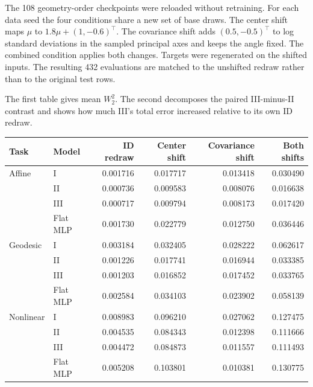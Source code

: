 \documentclass[11pt]{article}
\numberwithin{equation}{section}
\begin{document}
The 108 geometry-order checkpoints were reloaded without retraining.
For each data seed the four conditions share a new set of base draws.
The center shift maps \(\mu\) to \(1.8\mu+(1,-0.6)^\top\).
The covariance shift adds \((0.5,-0.5)^\top\) to log standard deviations
in the sampled principal axes and keeps the angle fixed. The combined
condition applies both changes. Targets were regenerated on the shifted
inputs. The resulting 432 evaluations are matched to the unshifted
redraw rather than to the original test rows.

The first table gives mean \(W_2^2\). The second decomposes the paired
III-minus-II contrast and shows how much III's total error increased
relative to its own ID redraw.

\begin{center}
\small
\begin{tabularx}{\linewidth}{@{} Y l r r r r @{}}
\toprule
\textbf{Task} & \textbf{Model} & \textbf{ID redraw} & \textbf{Center shift} & \textbf{Covariance shift} & \textbf{Both shifts} \\
\midrule
Affine & I & 0.001716 & 0.017717 & 0.013418 & 0.030490 \\
 & II & 0.000736 & 0.009583 & 0.008076 & 0.016638 \\
 & III & 0.000717 & 0.009794 & 0.008173 & 0.017420 \\
 & Flat MLP & 0.001730 & 0.022779 & 0.012750 & 0.036446 \\
Geodesic & I & 0.003184 & 0.032405 & 0.028222 & 0.062617 \\
 & II & 0.001226 & 0.017741 & 0.016944 & 0.033385 \\
 & III & 0.001203 & 0.016852 & 0.017452 & 0.033765 \\
 & Flat MLP & 0.002584 & 0.034103 & 0.023902 & 0.058139 \\
Nonlinear & I & 0.008983 & 0.096210 & 0.027062 & 0.127475 \\
 & II & 0.004535 & 0.084343 & 0.012398 & 0.111666 \\
 & III & 0.004472 & 0.084873 & 0.011557 & 0.111493 \\
 & Flat MLP & 0.005208 & 0.103801 & 0.010381 & 0.130775 \\
\bottomrule
\end{tabularx}
\end{center}
\end{document}
